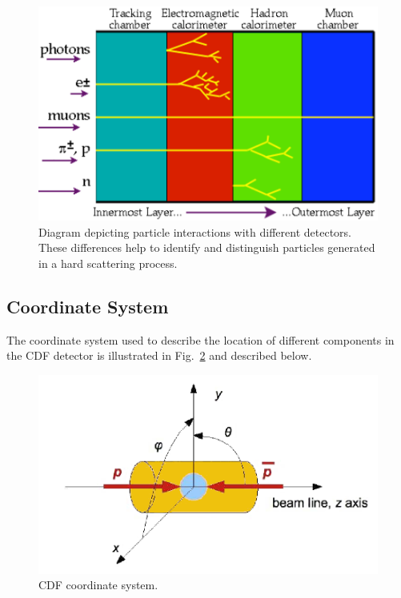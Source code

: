 \begin{figure}[htbm]
\begin{centering}
\includegraphics[scale=0.7]{decay_chart.pdf}
\caption{Diagram depicting particle interactions with different detectors. These differences help
to identify and distinguish particles generated in a hard scattering process.}
\label{fig:particledecay}
\end{centering}
\end{figure}

\subsection{Coordinate System}
The coordinate system used to describe the location of different components in the CDF detector is illustrated in Fig.~\ref{fig:cdfCDTsystem} and described below.

\begin{figure}[htbm]
 \centering
 \includegraphics[scale=.5]{./cdfCoordinateSystem.png}
 \caption{CDF coordinate system.}
 \label{fig:cdfCDTsystem}
\end{figure}

